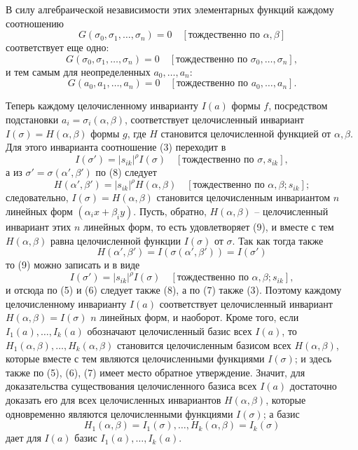 \documentclass[11pt]{article}
\begin{document}
В силу алгебраической независимости этих элементарных функций каждому соотношению
\begin{equation}
        G(\sigma_0,\sigma_1,\ldots,\sigma_n)=0
        \quad [\text{тождественно по \(\alpha,\beta\)}]
\end{equation}
соответствует еще одно:
\begin{equation}
        G(\sigma_0,\sigma_1,\ldots,\sigma_n)=0
        \quad [\text{тождественно по \(\sigma_0,\ldots,\sigma_n\)}],
\end{equation}
и тем самым для неопределенных \(a_0,\ldots,a_n\):
\begin{equation}
        G(a_0,a_1,\ldots,a_n)=0
        \quad [\text{тождественно по \(a_0,\ldots,a_n\)}].
\end{equation}

Теперь каждому целочисленному инварианту \(I(a)\) формы \(f\), посредством подстановки \(a_i=\sigma_i(\alpha,\beta)\), соответствует целочисленный инвариант \(I(\sigma)=H(\alpha,\beta)\) формы \(g\), где \(H\) становится целочисленной функцией от \(\alpha,\beta\). Для этого инварианта соотношение (3) переходит в
\begin{equation}
        I(\sigma')=|s_{ik}|^\rho I(\sigma)
        \quad [\text{тождественно по \(\sigma,s_{ik}\)}],
\end{equation}
а из \(\sigma'=\sigma(\alpha',\beta')\) по (8) следует
\begin{equation}
        H(\alpha',\beta')=|s_{ik}|^\rho H(\alpha,\beta)
        \quad [\text{тождественно по \(\alpha,\beta;s_{ik}\)}];
\end{equation}
следовательно, \(I(\sigma)=H(\alpha,\beta)\) становится целочисленным инвариантом \(n\) линейных форм \((\alpha_i x+\beta_i y)\). Пусть, обратно, \(H(\alpha,\beta)\) -- целочисленный инвариант этих \(n\) линейных форм, то есть удовлетворяет (9), и вместе с тем \(H(\alpha,\beta)\) равна целочисленной функции \(I(\sigma)\) от \(\sigma\). Так как тогда также
\[
        H(\alpha',\beta')=I(\sigma(\alpha',\beta'))=I(\sigma')
\]
то (9) можно записать и в виде
\begin{equation*}
        I(\sigma')=|s_{ik}|^\rho I(\sigma)
        \quad [\text{тождественно по \(\alpha,\beta;s_{ik}\)}],\tag{9a}
\end{equation*}
и отсюда по (5) и (6) следует также (8), а по (7) также (3). Поэтому каждому целочисленному инварианту \(I(a)\) соответствует целочисленный инвариант \(H(\alpha,\beta)=I(\sigma)\) \(n\) линейных форм, и наоборот. Кроме того, если \(I_1(a),\ldots,I_k(a)\) обозначают целочисленный базис всех \(I(a)\), то \(H_1(\alpha,\beta),\ldots,H_k(\alpha,\beta)\) становится целочисленным базисом всех \(H(\alpha,\beta)\), которые вместе с тем являются целочисленными функциями \(I(\sigma)\); и здесь также по (5), (6), (7) имеет место обратное утверждение. Значит, для доказательства существования целочисленного базиса всех \(I(a)\) достаточно доказать его для всех целочисленных инвариантов \(H(\alpha,\beta)\), которые одновременно являются целочисленными функциями \(I(\sigma)\); а базис
\[
        H_1(\alpha,\beta)=I_1(\sigma),\ldots,H_k(\alpha,\beta)=I_k(\sigma)
\]
дает для \(I(a)\) базис \(I_1(a),\ldots,I_k(a)\).
\end{document}
